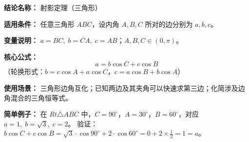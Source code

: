 \textbf{结论名称：} 射影定理（三角形）

\textbf{适用条件：} 任意三角形 \(ABC\)，设内角 \(A,B,C\) 所对的边分别为 \(a,b,c\)。

\textbf{变量说明：} \(a=BC,\;b=CA,\;c=AB\)；\(A,B,C\in(0,\pi)\)。

\textbf{核心公式：} 
\[
\boxed{a = b\cos C + c\cos B}
\]
（轮换形式：\(b = c\cos A + a\cos C\)，\(c = a\cos B + b\cos A\)）

\textbf{使用场景：} 三角形边角互化；已知两边及其夹角可以快速求第三边；化简涉及边角混合的三角恒等式。

\textbf{简单例子：} 在 \(Rt\triangle ABC\) 中，\(C=90^\circ\)，\(A=30^\circ\)，\(B=60^\circ\)，对应 \(a=1,\;b=\sqrt3,\;c=2\)。
验证：\(b\cos C+c\cos B = \sqrt3\cdot\cos90^\circ + 2\cdot\cos60^\circ = 0 + 2\times\frac12 = 1 = a\)。